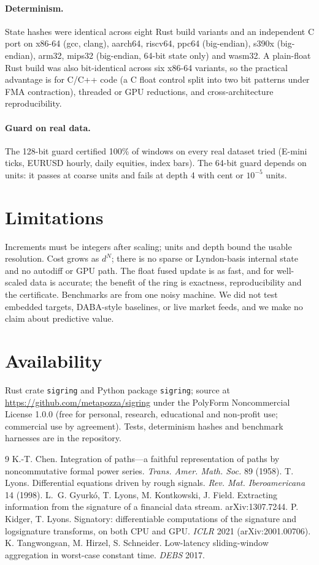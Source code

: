 \documentclass[11pt]{article}
\theoremstyle{remark}\newtheorem{remark}{Remark}
\begin{document}
\paragraph{Determinism.} State hashes were identical across eight Rust build variants and an independent C port on x86-64 (gcc, clang), aarch64, riscv64, ppc64 (big-endian), s390x (big-endian), arm32, mips32 (big-endian, 64-bit state only) and wasm32. A plain-float Rust build was also bit-identical across six x86-64 variants, so the practical advantage is for C/C++ code (a C float control split into two bit patterns under FMA contraction), threaded or GPU reductions, and cross-architecture reproducibility.

\paragraph{Guard on real data.} The 128-bit guard certified 100\% of windows on every real dataset tried (E-mini ticks, EURUSD hourly, daily equities, index bars). The 64-bit guard depends on units: it passes at coarse units and fails at depth 4 with cent or $10^{-5}$ units.

\section{Limitations}
Increments must be integers after scaling; units and depth bound the usable resolution. Cost grows as $d^N$; there is no sparse or Lyndon-basis internal state and no autodiff or GPU path. The float fused update is as fast, and for well-scaled data is accurate; the benefit of the ring is exactness, reproducibility and the certificate. Benchmarks are from one noisy machine. We did not test embedded targets, DABA-style baselines, or live market feeds, and we make no claim about predictive value.

\section*{Availability}
Rust crate \texttt{sigring} and Python package \texttt{sigring}; source at \url{https://github.com/metapozza/sigring} under the PolyForm Noncommercial License 1.0.0 (free for personal, research, educational and non-profit use; commercial use by agreement). Tests, determinism hashes and benchmark harnesses are in the repository.

\begin{thebibliography}{9}
 K.-T. Chen. Integration of paths---a faithful representation of paths by noncommutative formal power series. \emph{Trans. Amer. Math. Soc.} 89 (1958).
 T. Lyons. Differential equations driven by rough signals. \emph{Rev. Mat. Iberoamericana} 14 (1998).
 L.~G. Gyurk\'o, T. Lyons, M. Kontkowski, J. Field. Extracting information from the signature of a financial data stream. arXiv:1307.7244.
 P. Kidger, T. Lyons. Signatory: differentiable computations of the signature and logsignature transforms, on both CPU and GPU. \emph{ICLR} 2021 (arXiv:2001.00706).
 K. Tangwongsan, M. Hirzel, S. Schneider. Low-latency sliding-window aggregation in worst-case constant time. \emph{DEBS} 2017.
\end{thebibliography}
\end{document}
